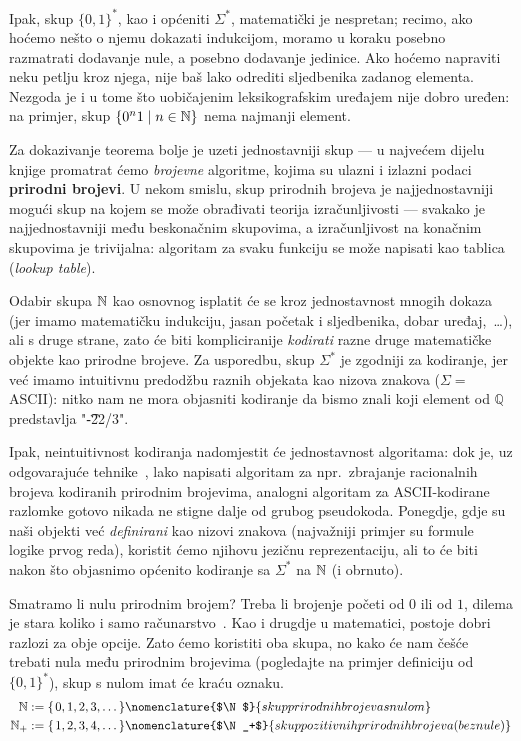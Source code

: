 Ipak, skup $\{0,1\}^*$, kao i općeniti $\Sigma^*$, matematički je nespretan; recimo, ako hoćemo nešto o njemu dokazati indukcijom, moramo u koraku posebno razmatrati dodavanje nule, a posebno dodavanje jedinice. Ako hoćemo napraviti neku petlju kroz njega, nije baš lako odrediti sljedbenika zadanog elementa. Nezgoda je i u tome što uobičajenim leksikografskim uređajem nije dobro uređen: na primjer, skup $\{0^n1\mid n\in{\mathbb N}\}$ nema najmanji element.

Za dokazivanje teorema bolje je uzeti jednostavniji skup --- u najvećem dijelu knjige promatrat ćemo \emph{brojevne} algoritme, kojima su ulazni i izlazni podaci \textbf{prirodni brojevi}. U nekom smislu, skup prirodnih brojeva je najjednostavniji mogući skup na kojem se može obrađivati teorija izračunljivosti --- svakako je najjednostavniji među beskonačnim skupovima, a izračunljivost na konačnim skupovima je trivijalna: algoritam za svaku funkciju se može napisati kao tablica (\emph{lookup table}).

Odabir skupa ${\mathbb N}$ kao osnovnog isplatit će se kroz jednostavnost mnogih dokaza (jer imamo matematičku indukciju, jasan početak i sljedbenika, dobar uređaj,~\ldots), ali s druge strane, zato će biti kompliciranije \emph{kodirati} razne druge matematičke objekte kao prirodne brojeve. Za usporedbu, skup $\Sigma^*$ je zgodniji za kodiranje, jer već imamo intuitivnu predodžbu raznih objekata kao nizova znakova ($\Sigma=$ ASCII\@): nitko nam ne mora objasniti kodiranje da bismo znali koji element od $\mathbb Q$ predstavlja "\t{-22/3}".

Ipak, neintuitivnost kodiranja nadomjestit će jednostavnost algoritama: dok je, uz odgovarajuće tehnike~\cite{posav}, lako napisati algoritam za npr.\ zbrajanje racionalnih brojeva kodiranih prirodnim brojevima, analogni algoritam za ASCII-kodirane razlomke gotovo nikada ne stigne dalje od grubog pseudokoda. Ponegdje, gdje su naši objekti već \emph{definirani} kao nizovi znakova (najvažniji primjer su formule logike prvog reda), koristit ćemo njihovu jezičnu reprezentaciju, ali to će biti nakon što objasnimo općenito kodiranje sa $\Sigma^*$ na ${\mathbb N}$ (i obrnuto).

Smatramo li nulu prirodnim brojem? Treba li brojenje početi od $0$ ili od $1$, dilema je stara koliko i samo računarstvo~\cite{note:EWD831}. Kao i drugdje u matematici, postoje dobri razlozi za obje opcije. Zato ćemo koristiti oba skupa, no kako će nam češće trebati nula među prirodnim brojevima (pogledajte na primjer definiciju od $\{0,1\}^*$), skup s nulom imat će kraću oznaku.
\begin{align}
	\N&:=\{\mspace{2mu}0,1,2,3,\dotsc\}\nomenclature{$\N$}{skup prirodnih brojeva s nulom}\\
	\N_+&:=\{\mspace{2mu}1,2,3,4,\dotsc\}\nomenclature{$\N_+$}{skup pozitivnih prirodnih brojeva (bez nule)}
\end{align}

